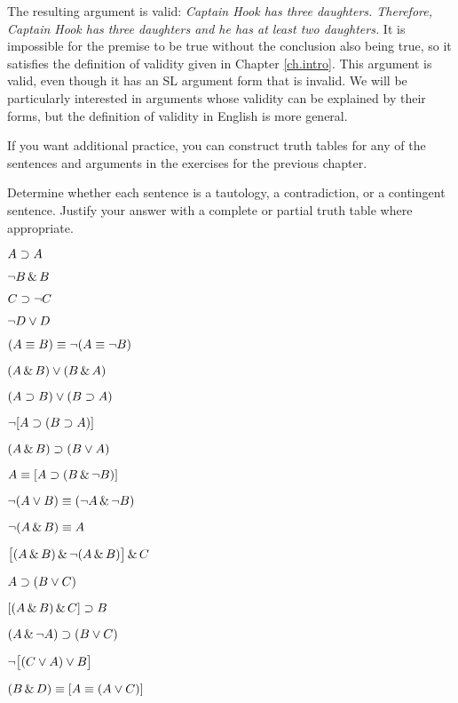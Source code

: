 The resulting argument is valid: \emph{Captain Hook has three daughters. Therefore, Captain Hook has three daughters and he has at least two daughters.} It is impossible for the premise to be true without the conclusion also being true, so it satisfies the definition of validity given in Chapter \ref{ch.intro}. This argument is valid, even though it has an SL argument form that is invalid. We will be particularly interested in arguments whose validity can be explained by their forms, but the definition of validity in English is more general.

\practiceproblems
If you want additional practice, you can construct truth tables for any of the sentences and arguments in the exercises for the previous chapter.

\solutions
\problempart
\label{pr.TT.TTorC}
Determine whether each sentence is a tautology, a contradiction, or a contingent sentence. Justify your answer with a complete or partial truth table where appropriate.
\begin{earg}
\item $A \supset A$ %
\item $\neg B \,\&\, B$ %
\item $C \supset\neg C$ %
\item $\neg D \vee D$ %
\item $(A \equiv B) \equiv \neg(A\equiv \neg B)$ %
\item $(A\,\&\, B) \vee (B\,\&\, A)$ %
\item $(A \supset B) \vee (B \supset A)$ %
\item $\neg[A \supset (B \supset A)]$ %
\item $(A \,\&\, B) \supset (B \vee A)$  %
\item $A \equiv [A \supset (B \,\&\, \neg B)]$ %
\item $\neg(A \vee B) \equiv (\neg A \,\&\, \neg B)$ %
\item $\neg(A\,\&\, B) \equiv A$ %
\item $\bigl[(A\,\&\, B) \,\&\,\neg(A\,\&\, B)\bigr] \,\&\, C$ %
\item $A\supset(B\vee C)$ %
\item $[(A \,\&\, B) \,\&\, C] \supset B$ %
\item $(A \,\&\,\neg A) \supset (B \vee C)$ %
\item $\neg\bigl[(C\vee A) \vee B\bigr]$ %
\item $(B\,\&\, D) \equiv [A \equiv(A \vee C)]$%
\end{earg}


